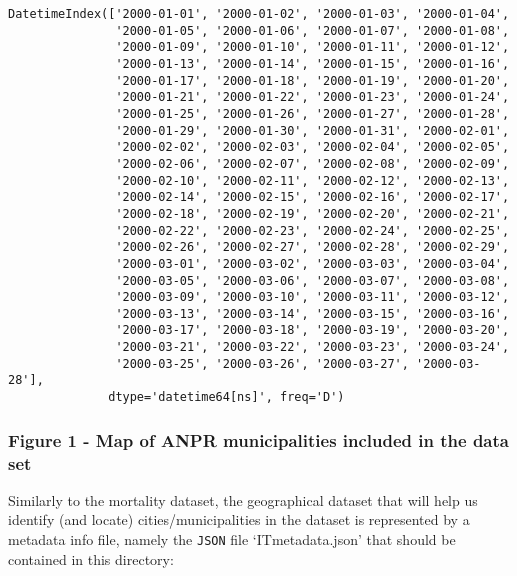 \documentclass[11pt]{article}
\begin{document}
    \begin{Verbatim}[commandchars=\\\{\}]
DatetimeIndex(['2000-01-01', '2000-01-02', '2000-01-03', '2000-01-04',
               '2000-01-05', '2000-01-06', '2000-01-07', '2000-01-08',
               '2000-01-09', '2000-01-10', '2000-01-11', '2000-01-12',
               '2000-01-13', '2000-01-14', '2000-01-15', '2000-01-16',
               '2000-01-17', '2000-01-18', '2000-01-19', '2000-01-20',
               '2000-01-21', '2000-01-22', '2000-01-23', '2000-01-24',
               '2000-01-25', '2000-01-26', '2000-01-27', '2000-01-28',
               '2000-01-29', '2000-01-30', '2000-01-31', '2000-02-01',
               '2000-02-02', '2000-02-03', '2000-02-04', '2000-02-05',
               '2000-02-06', '2000-02-07', '2000-02-08', '2000-02-09',
               '2000-02-10', '2000-02-11', '2000-02-12', '2000-02-13',
               '2000-02-14', '2000-02-15', '2000-02-16', '2000-02-17',
               '2000-02-18', '2000-02-19', '2000-02-20', '2000-02-21',
               '2000-02-22', '2000-02-23', '2000-02-24', '2000-02-25',
               '2000-02-26', '2000-02-27', '2000-02-28', '2000-02-29',
               '2000-03-01', '2000-03-02', '2000-03-03', '2000-03-04',
               '2000-03-05', '2000-03-06', '2000-03-07', '2000-03-08',
               '2000-03-09', '2000-03-10', '2000-03-11', '2000-03-12',
               '2000-03-13', '2000-03-14', '2000-03-15', '2000-03-16',
               '2000-03-17', '2000-03-18', '2000-03-19', '2000-03-20',
               '2000-03-21', '2000-03-22', '2000-03-23', '2000-03-24',
               '2000-03-25', '2000-03-26', '2000-03-27', '2000-03-28'],
              dtype='datetime64[ns]', freq='D')
    \end{Verbatim}

    \hypertarget{figure-1---map-of-anpr-municipalities-included-in-the-data-set}{%
\subsubsection{Figure 1 - Map of ANPR municipalities included in the
data
set}\label{figure-1---map-of-anpr-municipalities-included-in-the-data-set}}

    Similarly to the mortality dataset, the geographical dataset that will
help us identify (and locate) cities/municipalities in the dataset is
represented by a metadata info file, namely the \texttt{JSON} file
`ITmetadata.json' that should be contained in this directory:
\end{document}
